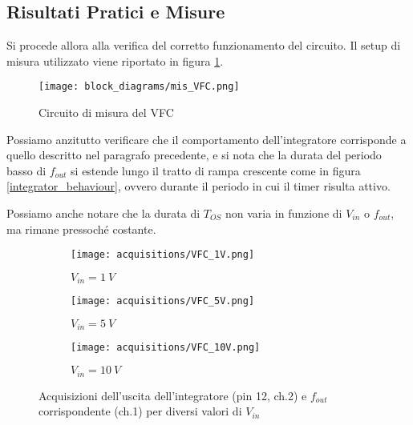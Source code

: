 
\subsection*{Risultati Pratici e Misure}


Si procede allora alla verifica del corretto funzionamento del circuito. Il setup di
misura utilizzato viene riportato in figura \ref{mis_VFC}.

\begin{figure}[H]
    \centering
    \texttt{[image: block\_diagrams/mis\_VFC.png]}
    \caption{Circuito di misura del VFC}
    \label{mis_VFC}
\end{figure}

Possiamo anzitutto verificare che il comportamento dell'integratore corrisponde a quello
descritto nel paragrafo precedente, e si nota che la durata del periodo basso di $f_{out}$
si estende lungo il tratto di rampa crescente come in figura \ref{integrator_behaviour},
ovvero durante il periodo in cui il timer risulta attivo.

Possiamo anche notare che la durata di $T_{OS}$ non varia in funzione di $V_{in}$ o $f_{out}$,
ma rimane pressoché costante.

\begin{figure}[H]
    \centering

    \begin{subfigure}{.5\textwidth}
        \centering
        \texttt{[image: acquisitions/VFC\_1V.png]}
        \caption{$V_{in}=1\ V$}
        \label{acq_vfc110_1v}
    \end{subfigure}%
    \begin{subfigure}{.5\textwidth}
        \centering
        \texttt{[image: acquisitions/VFC\_5V.png]}
        \caption{$V_{in}=5\ V$}
        \label{acq_vfc110_5v}
    \end{subfigure}
    \begin{subfigure}{.5\textwidth}
        \centering
        \texttt{[image: acquisitions/VFC\_10V.png]}
        \caption{$V_{in}=10\ V$}
        \label{acq_vfc110_10v}
    \end{subfigure}

    \caption{Acquisizioni dell'uscita dell'integratore (pin 12, ch.2) e $f_{out}$
        corrispondente (ch.1) per diversi valori di $V_{in}$}
    \label{acq_vfc110}
\end{figure}

